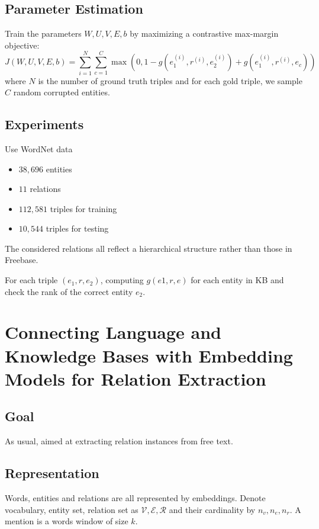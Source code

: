 \documentclass[10pt]{article} %
\theoremstyle{definition}
\theoremstyle{definition}
\begin{document}
\subsection{Parameter Estimation}
Train the parameters $W, U, V, E, b$ by maximizing a contrastive max-margin objective:
\begin{equation}
J(W, U, V, E, b) = \sum_{i=1}^{N}\sum_{c=1}^{C}\max(0, 1-g(e_{1}^{(i)},r^{(i)},e_{2}^{(i)}) + g(e_{1}^{(i)}, r^{(i)}, e_{c}))
\end{equation}
where $N$ is the number of ground truth triples and for each gold triple, we sample $C$ random corrupted entities. 



\subsection{Experiments}
Use WordNet data 
\begin{itemize}
\item $38,696$ entities 
\item $11$ relations 
\item $112,581$ triples for training
\item $10,544$ triples for testing
\end{itemize}
The considered relations all reflect a hierarchical structure rather than those in Freebase. 



For each triple $(e_1, r, e_2)$, computing $g(e1, r, e)$ for each entity in KB and check the rank of the correct entity $e_2$. 



\section{Connecting Language and Knowledge Bases with Embedding Models for Relation Extraction}
\subsection{Goal}
As usual, aimed at extracting relation instances from free text. 



\subsection{Representation}
Words, entities and relations are all represented by embeddings. 
Denote vocabulary, entity set, relation set as $\mathcal{V}, \mathcal{E}, \mathcal{R}$ and their cardinality by $n_v, n_e, n_r$. 
A mention is a words window of size $k$. 
\end{document}
